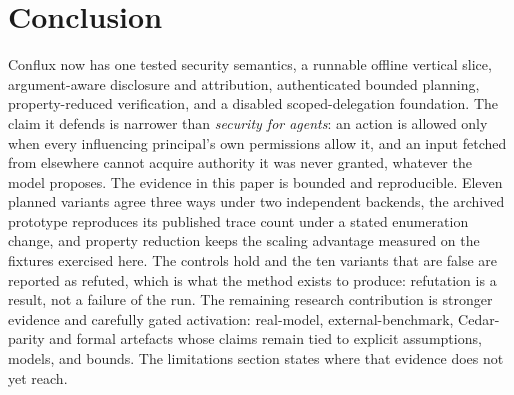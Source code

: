 \documentclass[11pt]{article}
\begin{document}
\section{Conclusion}
Conflux now has one tested security semantics, a runnable offline vertical
slice, argument-aware disclosure and attribution, authenticated bounded
planning, property-reduced verification, and a disabled scoped-delegation
foundation. The claim it defends is narrower than \emph{security for agents}:
an action is allowed only when every influencing principal's own permissions
allow it, and an input fetched from elsewhere cannot acquire authority it was
never granted, whatever the model proposes. The evidence in this paper is
bounded and reproducible. Eleven planned variants agree three ways under two
independent backends, the archived prototype reproduces its published trace
count under a stated enumeration change, and property reduction keeps the
scaling advantage measured on the fixtures exercised here. The controls hold and
the ten variants that are false are reported as refuted, which is what the
method exists to produce: refutation is a result, not a failure of the run. The
remaining research contribution is stronger evidence and carefully gated
activation: real-model, external-benchmark, Cedar-parity and formal artefacts
whose claims remain tied to explicit assumptions, models, and bounds. The
limitations section states where that evidence does not yet reach.



\end{document}
